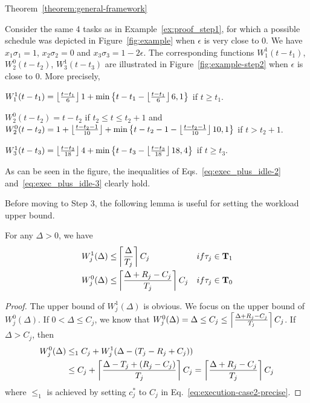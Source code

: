 \begin{appProof}{Theorem~\ref{theorem:general-framework}}
\begin{example}
Consider the same 4 tasks as in Example~\ref{ex:proof_step1}, for which a possible schedule was depicted in Figure~\ref{fig:example} when $\epsilon$ is very close to $0$. We have $x_1\sigma_1=1$, $x_2\sigma_2=0$ and $x_3\sigma_3=1-2\epsilon$. The corresponding functions
$W_1^1(t-t_1)$, $W_2^0(t-t_2)$, $W_3^1(t-t_3)$ are illustrated in
Figure~\ref{fig:example-step2} when $\epsilon$ is close to $0$. More precisely,

{\footnotesize \begin{compactitem}
  \item $W_1^1(t-t_1) = \left\lfloor{\frac{t-t_1}{6}}\right\rfloor1 + \min\left\{t-t_1-\left\lfloor{\frac{t-t_1}{6}}\right\rfloor6, 1\right\}$ if $t \geq t_1$.
  \item $W_2^0(t-t_2) = t-t_2$ if $t_2 \leq t \leq t_2 + 1$ and $W_2^0(t-t_2) = 1 + \left\lfloor{\frac{t-t_2-1}{10}}\right\rfloor + \min\left\{t-t_2-1-\left\lfloor{\frac{t-t_2-1}{10}}\right\rfloor10, 1\right\}$ if $t > t_2+1$.
  \item $W_3^1(t-t_3) = \left\lfloor{\frac{t-t_3}{18}}\right\rfloor4 + \min\left\{t-t_3-\left\lfloor{\frac{t-t_3}{18}}\right\rfloor18, 4\right\}$ if $t \geq t_3$.
\end{compactitem}
}As can be seen in the figure, the inequalities of Eqs.~\eqref{eq:exec_plus_idle-2} and~\eqref{eq:exec_plus_idle-3} clearly hold.\myendproof
\end{example}


Before moving to Step 3, the following lemma is useful for setting the workload upper bound.
\begin{Lemma}
  \label{lemma:W_0-and-W_1-upper}
For any $\Delta > 0$, we have
\begin{align}
  W_j^1(\Delta)  \leq &\ceiling{\frac{\Delta}{T_j}}C_j & \mbox{ if } \tau_j \in {\bf T}_1   \label{eq:W_1-upper}\\
  W_j^0(\Delta)  \leq &\ceiling{\frac{\Delta+R_j-C_j}{T_j}}C_j & \mbox{ if } \tau_j \in {\bf T}_0   \label{eq:W_0-upper}
\end{align}
\end{Lemma}
\begin{proof}
  The upper bound of $W_j^1(\Delta)$ is obvious. We focus on the upper bound of $W_j^0(\Delta)$. If $0 < \Delta \leq C_j$, we know that $W_j^0(\Delta) = \Delta \leq C_j \leq \left\lceil{\frac{\Delta+R_j-C_j}{T_j}}\right\rceil C_j$. If $\Delta > C_j$, then 
{\small \begin{align*}
W_j^0(\Delta) &\leq_1 C_j + W_j^1(\Delta - (T_j-R_j+C_j))\nonumber\\
& \leq C_j+\left\lceil{\frac{\Delta-T_j +(R_j-C_j)}{T_j}}\right\rceil C_j  = \left\lceil{\frac{\Delta+R_j-C_j}{T_j}}\right\rceil C_j 
\end{align*}} where $\leq_1$ is achieved by setting
$c_j^*$ to $C_j$ in Eq.~\eqref{eq:execution-case2-precise}.
\end{proof}


\end{appProof}
